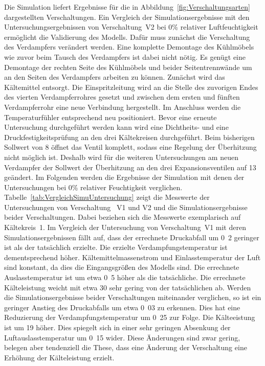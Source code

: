 Die Simulation liefert Ergebnisse für die in Abbildung~\ref{fig:Verschaltungsarten} dargestellten Verschaltungen. Ein Vergleich der Simulationsergebnisse mit den Untersuchungsergebnissen von Verschaltung~V2 bei \unit{0}{\%} relativer Luftfeuchtigkeit ermöglicht die Validierung des Modells. Dafür muss zunächst die Verschaltung des Verdampfers verändert werden. Eine komplette Demontage des Kühlmöbels wie zuvor beim Tausch des Verdampfers ist dabei nicht nötig. Es genügt eine Demontage der rechten Seite des Kühlmöbels und beider Seitentrennwände um an den Seiten des Verdampfers arbeiten zu können. Zunächst wird das Kältemittel entsorgt. Die Einspritzleitung wird an die Stelle des zuvorigen Endes des vierten Verdampferrohres gesetzt und zwischen dem ersten und fünften Verdampferrohr eine neue Verbindung hergestellt. Im Anschluss werden die Temperaturfühler entsprechend neu positioniert. Bevor eine erneute Untersuchung durchgeführt werden kann wird eine Dichtheits- und eine Druckfestigkeitsprüfung an den drei Kältekreisen durchgeführt. Beim bisherigen Sollwert von \unit{8}{\kelvin} öffnet das Ventil komplett, sodass eine Regelung der Überhitzung nicht möglich ist. Deshalb wird für die weiteren Untersuchungen am neuen Verdampfer der Sollwert der Überhitzung an den drei Expansionsventilen auf \unit{13}{\kelvin} geändert. \newline 
Im Folgenden werden die Ergebnisse der Simulation mit denen der Untersuchungen bei \unit{0}{\%} relativer Feuchtigkeit verglichen. Tabelle~\ref{tab:VergleichSimuUntersuchung} zeigt die Messwerte der Untersuchungen von Verschaltung~ V1 und V2 und die Simulationsergebnisse beider Verschaltungen. Dabei beziehen sich die Messwerte exemplarisch auf Kältekreis~1. 
Im Vergleich der Untersuchung von Verschaltung~V1 mit deren Simulationsergebnissen fällt auf, dass der errechnete Druckabfall um \unit{0.2}{\bbar} geringer ist als der tatsächlich erzielte. Die erzielte Verdampfungstemperatur ist dementsprechend höher.
Kältemittelmassenstrom und Einlasstemperatur der Luft sind konstant, da dies die Eingangsgrößen des Modells sind. Die errechnete Auslasstemperatur ist um etwa \unit{0.5}{\kelvin} höher als die tatsächliche. Die errechnete Kälteleistung weicht mit etwa \unit{30}{\watt} sehr gering von der tatsächlichen ab.  \newline Werden die Simulationsergebnisse beider Verschaltungen miteinander verglichen, so ist ein geringer Anstieg des Druckabfalls um etwa \unit{0.03}{\bbar} zu erkennen. Dies hat eine Reduzierung der Verdampfungstemperatur um \unit{0.25}{\kelvin} zur Folge. Die Kälteeistung ist um \unit{19}{\watt} höher. Dies spiegelt sich in einer sehr geringen Absenkung der Luftauslasstemperatur um \unit{0.15}{\kelvin} wider. Diese Änderungen sind zwar gering, belegen aber tendenziell die These, dass eine Änderung der Verschaltung eine Erhöhung der Kälteleistung erzielt. \newline
